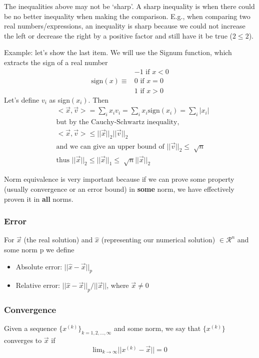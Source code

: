 \documentclass[12pt]{article}
\begin{document}
The inequalities above may not be `sharp'. A sharp inequality is when there could be no better inequality when making the comparison. E.g., when comparing two real numbers/expressions, an inequality is sharp because we could not increase the left or decrease the right by a positive factor and still have it be true ($2 \leq 2$). 

Example: let's show the last item. We will use the Signum function, which extracts the sign of a real number
\begin{align}
              & -1 \text{ if } x < 0 \nonumber \\
\text{sign}(x) \equiv &  0 \text{ if } x = 0 \nonumber \\
              &  1 \text{ if } x > 0 \nonumber
\end{align}
%
Let's define $v_i$ as sign$(x_i)$. Then
%
\begin{align}
&< \vec{x}, \vec{v} > = \sum_i x_i v_i = \sum_i x_i \text{sign}(x_i) = \sum_i |x_i| \nonumber \\
%
&\text{but by the Cauchy-Schwartz inequality,}\nonumber \\
%
&< \vec{x}, \vec{v} > \leq ||\vec{x}||_2 ||\vec{v}||_2 \nonumber \\
%
&\text{and we can give an upper bound of } ||\vec{v}||_2 \leq \sqrt[]{n} \nonumber \\ 
%
&\text{thus } ||\vec{x}||_2 \leq ||\vec{x}||_1 \leq \sqrt[]{n} ||\vec{x}||_2 \nonumber
\end{align}

Norm equivalence is very important because if we can prove some property (usually convergence or an error bound) in \textbf{some} norm, we have effectively proven it in \textbf{all} norms. 

\subsubsection{Error}
For $\vec{x}$ (the real solution) and $\hat{x}$ (representing our numerical solution) $\in \mathcal{R}^n$ and some norm p we define
%
\begin{itemize}
\item Absolute error: $||\hat{x} - \vec{x}||_p$
\item Relative error: $||\hat{x} - \vec{x}||_p / ||\vec{x}||$, where $\vec{x} \neq 0$
\end{itemize}

\subsubsection{Convergence}
Given a sequence $\lbrace x^{(k)} \rbrace_{k=1,2,\dots,\infty}$ and some norm, we say that $\lbrace x^{(k)} \rbrace$ converges to $\vec{x}$ if
%
\begin{equation}
\displaystyle\text{lim}_{k \rightarrow \infty} ||x^{(k)} - \vec{x}|| = 0 \nonumber
\end{equation}
\end{document}
